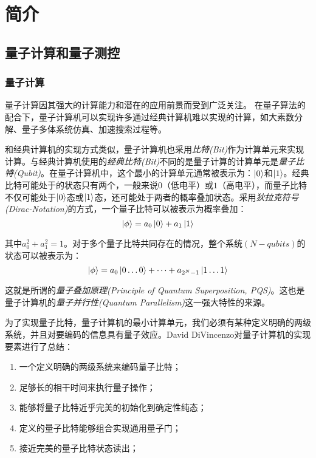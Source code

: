 
\chapter[简介]{简介\label{section:introduction}}
\section[量子计算和量子测控]{量子计算和量子测控}
\subsection[量子计算]{量子计算}
量子计算因其强大的计算能力和潜在的应用前景而受到广泛关注。
在量子算法的配合下，量子计算机可以实现许多通过经典计算机难以实现的计算，如大素数分解\cite[]{Shor_1997, Singleton_Jr_2023}、量子多体系统仿真\cite[]{Feynman_1982, Lloyd_1996}、加速搜索过程\cite[]{Grover_2002}等。

和经典计算机的实现方式类似，量子计算机也采用\emph{比特(Bit)}作为计算单元来实现计算。与经典计算机使用的\emph{经典比特(Bit)}不同的是量子计算的计算单元是\emph{量子比特(Qubit)}。在量子计算机中，这个最小的计算单元通常被表示为：$\ket{0}$和$\ket{1}$。经典比特可能处于的状态只有两个，一般来说$0$（低电平）或$1$（高电平），而量子比特不仅可能处于$\ket{0}$态或$\ket{1}$态，还可能处于两者的概率叠加状态。采用\emph{狄拉克符号(Dirac-Notation)}的方式，一个量子比特可以被表示为概率叠加：$$\ket{\phi}=a_0\ket{0}+a_1\ket{1}$$

其中$a_0^2+a_1^2=1$。对于多个量子比特共同存在的情况，整个系统$(N-qubits)$的状态可以被表示为：$$\ket{\phi}=a_0\ket{0\dots0}+\dots+a_{2^N-1}\ket{1\dots1}$$

这就是所谓的\emph{量子叠加原理(Principle of Quantum Superposition, PQS)}\cite[]{Fedorov_Manko_2019}。这也是量子计算机的\emph{量子并行性(Quantum Parallelism)}这一强大特性的来源。

为了实现量子比特，量子计算机的最小计算单元，我们必须有某种定义明确的两级系统，并且对要编码的信息具有量子效应。David DiVincenzo对量子计算机的实现要素进行了总结\cite[]{DiVincenzo_2000}：
\begin{enumerate}
    \item 一个定义明确的两级系统来编码量子比特；
    \item 足够长的相干时间来执行量子操作；
    \item 能够将量子比特近乎完美的初始化到确定性纯态；
    \item 定义的量子比特能够组合实现通用量子门；
    \item 接近完美的量子比特状态读出；
\end{enumerate}

